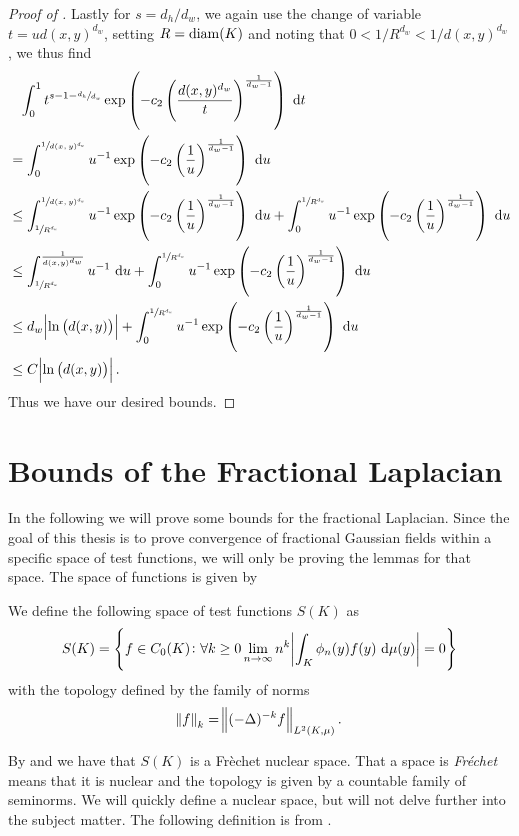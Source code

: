 \begin{proof}[Proof of ]
	\noi Lastly for $s = d_h/d_w$, we again use the change of variable $t = ud(x,y)^{d_w}$, setting $R = \operatorname{diam}(K)$ and noting that $0 < 1/R^{d_w} < 1/d(x,y)^{d_w}$, we thus find
	\begin{align}
		&\phantom{=}\int_{0}^{1} t^{s-1-\sfrac{d_h}{d_w}} \exp\left(-c_2 \left(\frac{d(x,y)^{d_w}}{t}\right)^{\frac{1}{d_w -1}}\right) \ \text{d} t \\
		&=\int_{0}^{\sfrac{1}{d(x,y)^{d_w}}} u^{-1} \exp\left(-c_2 \left(\frac{1}{u}\right)^{\frac{1}{d_w -1}}\right) \ \text{d} u \\
		&\leq \int_{\sfrac{1}{R^{d_w}}}^{\sfrac{1}{d(x,y)^{d_w}}} u^{-1} \exp\left(-c_2 \left(\frac{1}{u}\right)^{\frac{1}{d_w -1}}\right) \ \text{d} u + \int_{0}^{\sfrac{1}{R^{d_w}}} u^{-1} \exp\left(-c_2 \left(\frac{1}{u}\right)^{\frac{1}{d_w -1}}\right) \ \text{d} u  \\
		&\leq \int_{\sfrac{1}{R^{d_w}}}^{\frac{1}{d(x,y)^{d_w}}} u^{-1} \ \text{d} u + \int_{0}^{\sfrac{1}{R^{d_w}}} u^{-1} \exp\left(-c_2\left(\frac{1}{u}\right)^{\frac{1}{d_w -1}}\right) \ \text{d} u  \\
		& \leq d_w \abs{\ln \left(d(x,y)\right)} +\int_{0}^{\sfrac{1}{R^{d_w}}} u^{-1} \exp\left(-c_2\left(\frac{1}{u}\right)^{\frac{1}{d_w -1}}\right) \ \text{d} u \\
		& \leq C \abs{\ln \left(d(x,y) \right)}.
	\end{align}
	Thus we have our desired bounds.
\end{proof}

\section{Bounds of the Fractional Laplacian}
In the following we will prove some bounds for the fractional Laplacian. Since the goal of this thesis is to prove convergence of fractional Gaussian fields within a specific space of test functions, we will only be proving the lemmas for that space. The space of functions is given by

\medskip
\begin{defi}
	We define the following space of test functions $S(K)$ as
	\begin{equation}
		S(K) = \cbr{f \in C_0(K) \colon \forall k \geq 0 \lim_{n \to \infty} n ^{k} \abs{\int_{K} \phi_n(y)f(y) \dd \mu (y)} = 0}
	\end{equation}
	with the topology defined by the family of norms
	\begin{equation}
		\norm{f}_k = \norm{(-\Delta)^{-k}f}_{L^2(K, \mu)}.
	\end{equation}
\end{defi}
By \cite[Theorem 2]{germanOne} and  we have that $S(K)$ is a Frèchet nuclear space. That a space is \emph{Fréchet} means that it is nuclear and the topology is given by a countable family of seminorms. We will quickly define a nuclear space, but will not delve further into the subject matter. The following definition is from \cite[Chapter 50]{Treves}.

